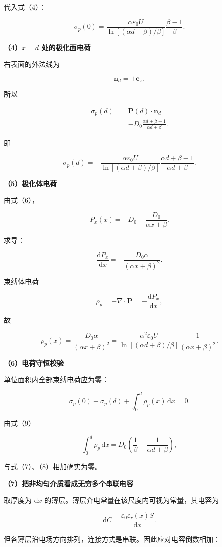\documentclass[12pt,a4paper,UTF8]{ctexart}
\begin{document}
代入式（4）：

\[
\boxed{
\sigma_p(0)
=\frac{\alpha\varepsilon_0U}
{\ln[(\alpha d+\beta)/\beta]}
\frac{\beta-1}{\beta}
}.
\tag{7}
\]

\textbf{（4）\(x=d\) 处的极化面电荷}

右表面的外法线为

\[
\bm n_d=+\bm e_x.
\]

所以

\[
\begin{aligned}
\sigma_p(d)
&=\bm P(d)\cdot\bm n_d\\
&=-D_0
\frac{\alpha d+\beta-1}{\alpha d+\beta}.
\end{aligned}
\]

即

\[
\boxed{
\sigma_p(d)
=-\frac{\alpha\varepsilon_0U}
{\ln[(\alpha d+\beta)/\beta]}
\frac{\alpha d+\beta-1}{\alpha d+\beta}
}.
\tag{8}
\]

\textbf{（5）极化体电荷}

由式（6），

\[
P_x(x)=-D_0+\frac{D_0}{\alpha x+\beta}.
\]

求导：

\[
\frac{\mathrm dP_x}{\mathrm dx}
=-\frac{D_0\alpha}{(\alpha x+\beta)^2}.
\]

束缚体电荷

\[
\rho_p=-\nabla\cdot\bm P
=-\frac{\mathrm dP_x}{\mathrm dx},
\]

故

\[
\boxed{
\rho_p(x)
=\frac{D_0\alpha}{(\alpha x+\beta)^2}
=\frac{\alpha^2\varepsilon_0U}
{\ln[(\alpha d+\beta)/\beta]}
\frac1{(\alpha x+\beta)^2}
}.
\tag{9}
\]

\textbf{（6）电荷守恒校验}

单位面积内全部束缚电荷应为零：

\[
\sigma_p(0)+\sigma_p(d)+\int_0^d\rho_p(x)\,\mathrm dx=0.
\tag{10}
\]

由式（9）

\[
\int_0^d\rho_p\,\mathrm dx
=D_0\left(
\frac1\beta-\frac1{\alpha d+\beta}
\right),
\]

与式（7）、（8）相加确实为零。

\textbf{（7）把非均匀介质看成无穷多个串联电容}

取厚度为 \(\mathrm dx\)
的薄层。薄层介电常量在该尺度内可视为常量，其电容为

\[
\mathrm dC=\frac{\varepsilon_0\varepsilon_r(x)S}{\mathrm dx}.
\]

但各薄层沿电场方向排列，连接方式是串联。因此应对电容倒数相加：
\end{document}
